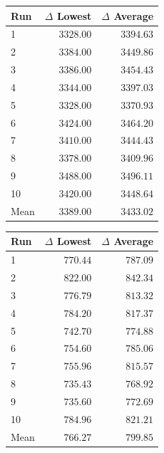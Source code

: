 \begin{table}[H]
    \centering
    \begin{minipage}[t]{0.48\textwidth}
        \centering
        \label{tab:gain-binary-barabasi-albert-1}
        \small
        \setlength{\tabcolsep}{4pt}
        \begin{tabular}{lrr}
            \toprule
            \textbf{Run} & \textbf{$\Delta$ Lowest} & \textbf{$\Delta$ Average} \\
            \midrule
            1 & $3328.00$ & $3394.63$ \\
            2 & $3384.00$ & $3449.86$ \\
            3 & $3386.00$ & $3454.43$ \\
            4 & $3344.00$ & $3397.03$ \\
            5 & $3328.00$ & $3370.93$ \\
            6 & $3424.00$ & $3464.20$ \\
            7 & $3410.00$ & $3444.43$ \\
            8 & $3378.00$ & $3409.96$ \\
            9 & $3488.00$ & $3496.11$ \\
            10 & $3420.00$ & $3448.64$ \\
            \midrule
            Mean & $3389.00$ & $3433.02$ \\
            \bottomrule
        \end{tabular}
    \end{minipage}
    \hfill
    \begin{minipage}[t]{0.48\textwidth}
        \centering
        \label{tab:gain-uniform-barabasi-albert-2}
        \small
        \setlength{\tabcolsep}{4pt}
        \begin{tabular}{lrr}
            \toprule
            \textbf{Run} & \textbf{$\Delta$ Lowest} & \textbf{$\Delta$ Average} \\
            \midrule
            1 & $770.44$ & $787.09$ \\
            2 & $822.00$ & $842.34$ \\
            3 & $776.79$ & $813.32$ \\
            4 & $784.20$ & $817.37$ \\
            5 & $742.70$ & $774.88$ \\
            6 & $754.60$ & $785.06$ \\
            7 & $755.96$ & $815.57$ \\
            8 & $735.43$ & $768.92$ \\
            9 & $735.60$ & $772.69$ \\
            10 & $784.96$ & $821.21$ \\
            \midrule
            Mean & $766.27$ & $799.85$ \\
            \bottomrule
        \end{tabular}
    \end{minipage}
\end{table}

